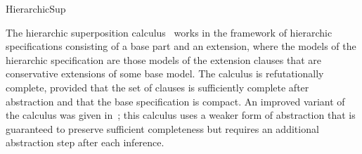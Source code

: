 \begin{entry}{HierarchicSup}
\begin{history}
The hierarchic superposition calculus~\cite{BachmairGanzingerWaldmann1992ALP,BachmairGanzingerWaldmann1994AAECC}
works in the framework of hierarchic specifications
consisting of a base part and an extension,
where the models of the hierarchic specification
are those models of the extension clauses that
are conservative extensions of some base model.
The calculus is refutationally complete,
provided that the set of clauses is sufficiently
complete after abstraction and that the base specification is compact.
An improved variant of the calculus
was given in~\cite{BaumgartnerWaldmann2013CADE};
this calculus uses a weaker form of abstraction that is
guaranteed to preserve sufficient completeness
but requires an additional abstraction step after each inference.

\end{history}


\end{entry}
